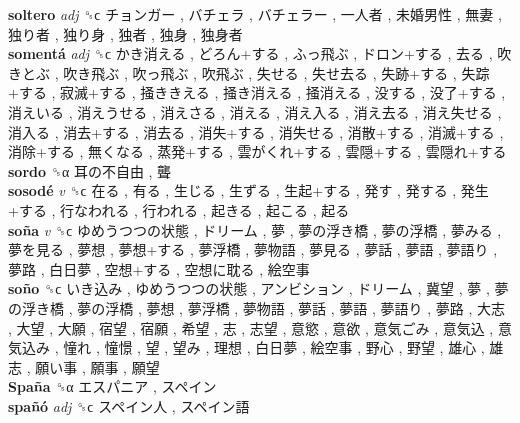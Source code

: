 \textbf{soltero} \emph{adj}  ␝ϲ   チョンガー ,  バチェラ ,  バチェラー ,  一人者 ,  未婚男性 ,  無妻 ,  独り者 ,  独り身 ,  独者 ,  独身 ,  独身者   \\
\textbf{somentá} \emph{adj}  ␝ϲ   かき消える ,  どろん+する ,  ふっ飛ぶ ,  ドロン+する ,  去る ,  吹きとぶ ,  吹き飛ぶ ,  吹っ飛ぶ ,  吹飛ぶ ,  失せる ,  失せ去る ,  失跡+する ,  失踪+する ,  寂滅+する ,  掻ききえる ,  掻き消える ,  掻消える ,  没する ,  没了+する ,  消えいる ,  消えうせる ,  消えさる ,  消える ,  消え入る ,  消え去る ,  消え失せる ,  消入る ,  消去+する ,  消去る ,  消失+する ,  消失せる ,  消散+する ,  消滅+する ,  消除+する ,  無くなる ,  蒸発+する ,  雲がくれ+する ,  雲隠+する ,  雲隠れ+する   \\
\textbf{sordo} ␝α   耳の不自由 ,  聾   \\
\textbf{sosodé} \emph{v}  ␝ϲ   在る ,  有る ,  生じる ,  生ずる ,  生起+する ,  発す ,  発する ,  発生+する ,  行なわれる ,  行われる ,  起きる ,  起こる ,  起る   \\
\textbf{soña} \emph{v}  ␝ϲ   ゆめうつつの状態 ,  ドリーム ,  夢 ,  夢の浮き橋 ,  夢の浮橋 ,  夢みる ,  夢を見る ,  夢想 ,  夢想+する ,  夢浮橋 ,  夢物語 ,  夢見る ,  夢話 ,  夢語 ,  夢語り ,  夢路 ,  白日夢 ,  空想+する ,  空想に耽る ,  絵空事   \\
\textbf{soño} ␝ϲ   いき込み ,  ゆめうつつの状態 ,  アンビション ,  ドリーム ,  冀望 ,  夢 ,  夢の浮き橋 ,  夢の浮橋 ,  夢想 ,  夢浮橋 ,  夢物語 ,  夢話 ,  夢語 ,  夢語り ,  夢路 ,  大志 ,  大望 ,  大願 ,  宿望 ,  宿願 ,  希望 ,  志 ,  志望 ,  意慾 ,  意欲 ,  意気ごみ ,  意気込 ,  意気込み ,  憧れ ,  憧憬 ,  望 ,  望み ,  理想 ,  白日夢 ,  絵空事 ,  野心 ,  野望 ,  雄心 ,  雄志 ,  願い事 ,  願事 ,  願望   \\
\textbf{Spaña} ␝α   エスパニア ,  スペイン   \\
\textbf{spañó} \emph{adj}  ␝ϲ   スペイン人 ,  スペイン語   \\
